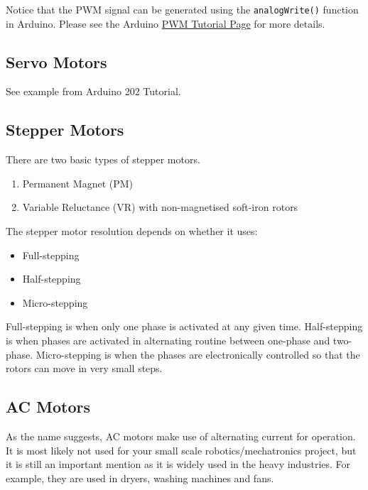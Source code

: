 \documentclass[paper=a4, fontsize=11pt]{article} %
\numberwithin{equation}{section} %
\numberwithin{figure}{section} %
\numberwithin{table}{section} %
\begin{document}
Notice that the PWM signal can be generated using the
\texttt{analogWrite()} function in Arduino. Please see the Arduino
\href{https://www.arduino.cc/en/Tutorial/PWM}{PWM Tutorial Page} for
more details.

\hypertarget{servo-motors}{%
\subsection{Servo Motors}\label{servo-motors}}

See example from Arduino 202 Tutorial.

\hypertarget{stepper-motors}{%
\subsection{Stepper Motors}\label{stepper-motors}}
There are two basic types of stepper motors.

\begin{enumerate}
    \item Permanent Magnet (PM)
    \item Variable Reluctance (VR) with non-magnetised soft-iron rotors
\end{enumerate}

The stepper motor resolution depends on whether it uses:

\begin{itemize}
    \item Full-stepping
    \item Half-stepping
    \item Micro-stepping
\end{itemize}

Full-stepping is when only one phase is activated at any given time. Half-stepping is when phases are activated in alternating routine between one-phase and two-phase. Micro-stepping is when the phases are electronically controlled so that the rotors can move in very small steps.

\hypertarget{ac-motors}{%
\subsection{AC Motors}\label{ac-motors}}

As the name suggests, AC motors make use of alternating current for operation. It is most likely not used for your small scale robotics/mechatronics project, but it is still an important mention as it is widely used in the heavy industries. For example, they are used in dryers, washing machines and fans.
\end{document}
